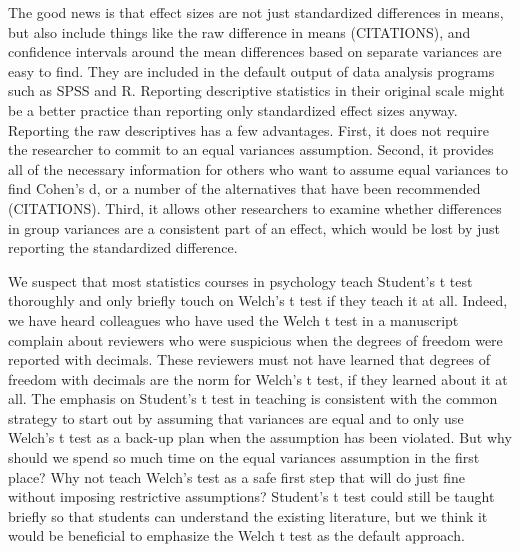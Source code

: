 \documentclass[man,a4paper,noextraspace,apacite]{apa6}
\begin{document}
    The good news is that effect sizes are not just standardized differences in means, but also include things like the raw difference in means (CITATIONS), and confidence intervals around the mean differences based on separate variances are easy to find. They are included in the default output of data analysis programs such as SPSS and R. Reporting descriptive statistics in their original scale might be a better practice than reporting only standardized effect sizes anyway. Reporting the raw descriptives has a few advantages. First, it does not require the researcher to commit to an equal variances assumption. Second, it provides all of the necessary information for others who want to assume equal variances to find Cohen's d, or a number of the alternatives that have been recommended (CITATIONS). Third, it allows other researchers to examine whether differences in group variances are a consistent part of an effect, which would be lost by just reporting the standardized difference.

    We suspect that most statistics courses in psychology teach Student's t test thoroughly and only briefly touch on Welch's t test if they teach it at all. Indeed, we have heard colleagues who have used the Welch t test in a manuscript complain about reviewers who were suspicious when the degrees of freedom were reported with decimals. These reviewers must not have learned that degrees of freedom with decimals are the norm for Welch's t test, if they learned about it at all. The emphasis on Student's t test in teaching is consistent with the common strategy to start out by assuming that variances are equal and to only use Welch's t test as a back-up plan when the assumption has been violated. But why should we spend so much time on the equal variances assumption in the first place? Why not teach Welch's test as a safe first step that will do just fine without imposing restrictive assumptions? Student's t test could still be taught briefly so that students can understand the existing literature, but we think it would be beneficial to emphasize the Welch t test as the default approach. 






\end{document}
